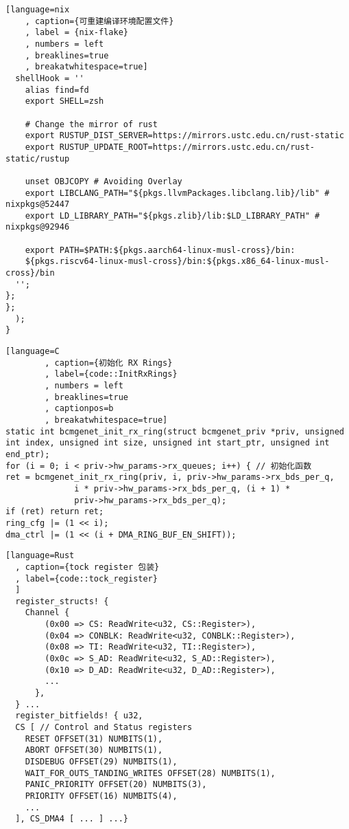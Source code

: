 \begin{lstlisting}[language=nix
    , caption={可重建编译环境配置文件}
    , label = {nix-flake}
    , numbers = left
    , breaklines=true
    , breakatwhitespace=true]
  shellHook = ''
    alias find=fd
    export SHELL=zsh

    # Change the mirror of rust
    export RUSTUP_DIST_SERVER=https://mirrors.ustc.edu.cn/rust-static
    export RUSTUP_UPDATE_ROOT=https://mirrors.ustc.edu.cn/rust-static/rustup

    unset OBJCOPY # Avoiding Overlay
    export LIBCLANG_PATH="${pkgs.llvmPackages.libclang.lib}/lib" # nixpkgs@52447
    export LD_LIBRARY_PATH="${pkgs.zlib}/lib:$LD_LIBRARY_PATH" # nixpkgs@92946
  
    export PATH=$PATH:${pkgs.aarch64-linux-musl-cross}/bin:
    ${pkgs.riscv64-linux-musl-cross}/bin:${pkgs.x86_64-linux-musl-cross}/bin
  '';
};
};
  );
}      
\end{lstlisting}

\begin{lstlisting}[language=C
        , caption={初始化 RX Rings}
        , label={code::InitRxRings}
        , numbers = left
        , breaklines=true
        , captionpos=b
        , breakatwhitespace=true]
static int bcmgenet_init_rx_ring(struct bcmgenet_priv *priv, unsigned int index, unsigned int size, unsigned int start_ptr, unsigned int end_ptr);
for (i = 0; i < priv->hw_params->rx_queues; i++) { // 初始化函数
ret = bcmgenet_init_rx_ring(priv, i, priv->hw_params->rx_bds_per_q,
              i * priv->hw_params->rx_bds_per_q, (i + 1) *
              priv->hw_params->rx_bds_per_q);
if (ret) return ret;
ring_cfg |= (1 << i);
dma_ctrl |= (1 << (i + DMA_RING_BUF_EN_SHIFT));
\end{lstlisting}

\begin{lstlisting}[language=Rust
  , caption={tock register 包装}
  , label={code::tock_register}
  ]
  register_structs! {
    Channel {
        (0x00 => CS: ReadWrite<u32, CS::Register>),
        (0x04 => CONBLK: ReadWrite<u32, CONBLK::Register>),
        (0x08 => TI: ReadWrite<u32, TI::Register>),
        (0x0c => S_AD: ReadWrite<u32, S_AD::Register>),
        (0x10 => D_AD: ReadWrite<u32, D_AD::Register>),
        ...
      },
  } ...
  register_bitfields! { u32,
  CS [ // Control and Status registers
    RESET OFFSET(31) NUMBITS(1),
    ABORT OFFSET(30) NUMBITS(1),
    DISDEBUG OFFSET(29) NUMBITS(1),
    WAIT_FOR_OUTS_TANDING_WRITES OFFSET(28) NUMBITS(1),
    PANIC_PRIORITY OFFSET(20) NUMBITS(3),
    PRIORITY OFFSET(16) NUMBITS(4),
    ...
  ], CS_DMA4 [ ... ] ...}
\end{lstlisting}
